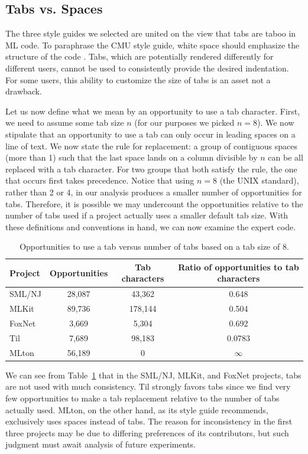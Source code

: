 \documentclass[12pt,abstracton]{scrartcl}
\begin{document}
\subsection{Tabs vs. Spaces}\label{subsec:tab}
The three style guides we selected are
united on the view that tabs are taboo in ML code. To paraphrase the CMU
style guide, white space should emphasize the structure of the code \cite{Cmu12}.
Tabs, which are potentially rendered differently for
different users, cannot be used to consistently provide the desired indentation.
For some users, this ability to customize the size of tabs is an asset not
a drawback.

Let us now define what we mean by an opportunity to use a tab character.
First, we need to assume some tab size $n$ (for our purposes we picked $n=8$).
We now stipulate that an opportunity to use a tab can only
occur in leading spaces on a line of text. We now state the rule for replacement:
a group of contiguous spaces (more than 1) such that the last space lands
on a column divisible by $n$ can be all replaced with a tab character.
For two groups that both satisfy the rule, the one that occurs first takes precedence.
Notice that using $n = 8$ (the UNIX standard), rather than 2 or 4, in our analysis produces a smaller number of
opportunities for tabs. Therefore, it is possible we may undercount the opportunities
relative to the number of tabs used if a project actually uses a smaller default tab size.
With these definitions and conventions in hand,
we can now examine the expert code.

\begin{table}[h!]
\centering
\begin{tabular}{|l||c|c||c|}
\hline
Project & Opportunities & Tab characters & Ratio of opportunities to tab characters \\ \hline\hline
SML/NJ & 28,087 & 43,362 & 0.648 \\
MLKit & 89,736 & 178,144 & 0.504 \\
FoxNet & 3,669 & 5,304 & 0.692 \\
Til & 7,689 & 98,183 & 0.0783 \\
MLton & 56,189 & 0 & $\infty$ \\ \hline
\end{tabular}
\caption{Opportunities to use a tab versus number of tabs based on a tab size of 8.}
\label{table:tabs}
\end{table}

We can see from Table~\ref{table:tabs} that
in the SML/NJ, MLKit, and FoxNet projects,
tabs are not used with much consistency.
Til strongly favors tabs since we find very few opportunities to make a tab replacement relative to the number of tabs actually used.
MLton, on the other hand, as its style guide recommends, exclusively
uses spaces instead of tabs. The reason for inconsistency in the first three projects
may be due to differing preferences of its contributors, but such judgment
must await analysis of future experiments.
\end{document}
